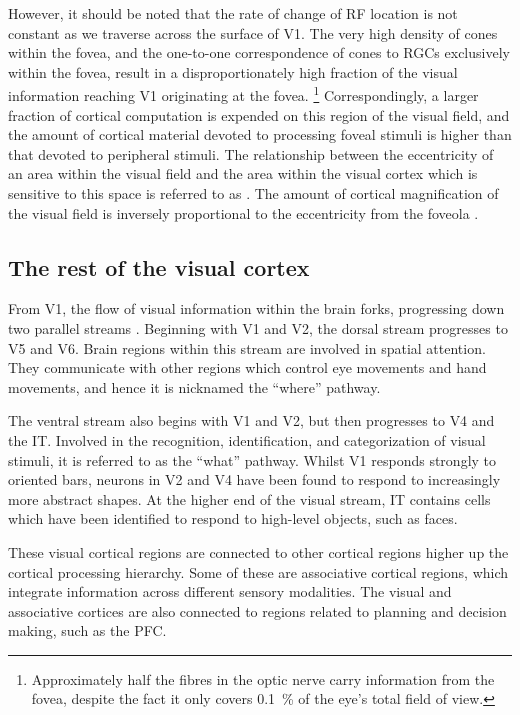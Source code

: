 However, it should be noted that the rate of change of \ac{RF} location is not constant as we traverse across the surface of \ac{V1}.
The very high density of cones within the fovea, and the one-to-one correspondence of cones to \acp{RGC} exclusively within the fovea, result in a disproportionately high fraction of the visual information reaching \ac{V1} originating at the fovea.%
\footnote{Approximately half the fibres in the optic nerve carry information from the fovea, despite the fact it only covers \SI{0.1}{\percent} of the eye's total field of view.}
Correspondingly, a larger fraction of cortical computation is expended on this region of the visual field, and the amount of cortical material devoted to processing foveal stimuli is higher than that devoted to peripheral stimuli.
The relationship between the eccentricity of an area within the visual field and the area within the visual cortex which is sensitive to this space is referred to as .
The amount of cortical magnification of the visual field is inversely proportional to the eccentricity from the foveola \citep{Strasburger2011}.


\subsection{The rest of the visual cortex}

From \ac{V1}, the flow of visual information within the brain forks, progressing down two parallel streams \citep{Goodale199220,Mishkin198257}.
Beginning with \ac{V1} and \ac{V2}, the dorsal stream progresses to \ac{V5} and \ac{V6}.
Brain regions within this stream are involved in spatial attention.
They communicate with other regions which control eye movements and hand movements, and hence it is nicknamed the ``where'' pathway.

The ventral stream also begins with \ac{V1} and \ac{V2}, but then progresses to \ac{V4} and the \acf{IT}.
Involved in the recognition, identification, and categorization of visual stimuli, it is referred to as the ``what'' pathway.
Whilst \ac{V1} responds strongly to oriented bars, neurons in \ac{V2} and \ac{V4} have been found to respond to increasingly more abstract shapes.
At the higher end of the visual stream, \ac{IT} contains cells which have been identified to respond to high-level objects, such as faces.%

These visual cortical regions are connected to other cortical regions higher up the cortical processing hierarchy.
Some of these are associative cortical regions, which integrate information across different sensory modalities.
The visual and associative cortices are also connected to regions related to planning and decision making, such as the \acf{PFC}.


